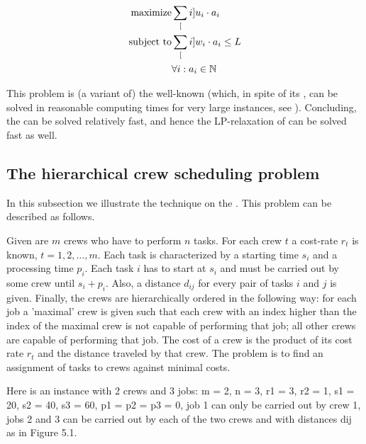 \begin{eqnarray}
\mbox{maximize}&\sum_[i]{u_i\cdot a_i}\eqnlab{pricing-m}\\
\mbox{subject to}&\sum_[i]{w_i\cdot a_i}\leq L\eqnlab{pricing-c1}\\
&\forall i:a_i\in\NNN\eqnlab{pricing-c2}
\end{eqnarray}

This problem is (a variant of) the well-known  (which, in spite of its , can be solved in reasonable computing times for very large instances, see ). Concluding, the  can be solved relatively fast, and hence the LP-relaxation of  can be solved fast as well.

\subsection{The hierarchical crew scheduling problem}

In this subsection we illustrate the  technique on the . This problem can be described as follows.

\begin{definition}
Given are $m$ crews who have to perform $n$ tasks. For each crew $t$ a cost-rate $r_t$ is known, $t=1,2,\ldots,m$. Each task is characterized by a starting time $s_i$ and a processing time $p_i$. Each task $i$ has to start at $s_i$ and must be carried out  by some crew until $s_i+p_i$. Also, a distance $d_{ij}$ for every pair of tasks $i$ and $j$ is given. Finally, the crews are hierarchically ordered in the following way: for each job a 'maximal' crew is given such that each crew with an index higher than the index of the maximal crew is not capable of performing that job; all other crews are capable of performing that job. The cost of a crew is the product of its cost rate $r_t$ and the distance traveled by that crew. The problem is to find an assignment of tasks to crews against minimal costs.
\end{definition}

\begin{example}
Here is an instance with 2 crews and 3 jobs:
m = 2, n = 3, r1 = 3, r2 = 1, s1 = 20, s2 = 40, s3 = 60, p1 = p2 = p3 = 0,
job 1 can only be carried out by crew 1, jobs 2 and 3 can be carried out by each of the two crews and
with distances dij as in Figure 5.1.
\end{example}

